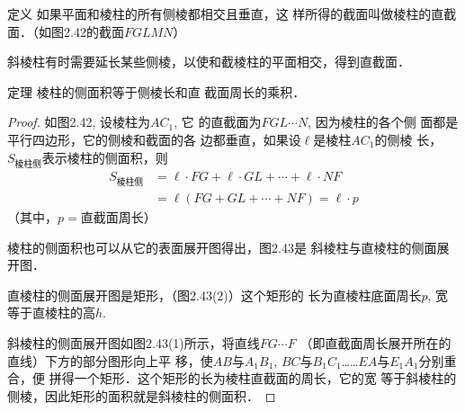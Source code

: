 \begin{blk}{定义}
    如果平面和棱柱的所有侧棱都相交且垂直，这
样所得的截面叫做棱柱的直截面．（如图2.42的截面$FGLM
N$）
\end{blk}

\begin{figure}[htp]
    \centering
{}
    \caption{}
\end{figure}


斜棱柱有时需要延长某些侧棱，以使和截棱柱的平面相交，得到直截面．

\begin{blk}{定理}
    棱柱的侧面积等于侧棱长和直
截面周长的乘积．
\end{blk}

\begin{proof}
如图2.42, 设棱柱为$AC_1$, 它
的直截面为$FGL\cdots N$, 因为棱柱的各个侧
面都是平行四边形，它的侧棱和截面的各
边都垂直，如果设$\ell$是棱柱$AC_1$的侧棱
长，$S_{\text{棱柱侧}}$表示棱柱的侧面积，则
\[\begin{split}
    S_{\text{棱柱侧}}&=\ell\cdot FG+\ell\cdot GL+\cdots+\ell\cdot NF\\
    &=\ell(FG+GL+\cdots+NF)=\ell\cdot p
\end{split}\]
（其中，$p=$直截面周长）

棱柱的侧面积也可以从它的表面展开图得出，图2.43是
斜棱柱与直棱柱的侧面展开图．

直棱柱的侧面展开图是矩形，（图2.43(2)）这个矩形的
长为直棱柱底面周长$p$, 宽等于直棱柱的高$h$. 

斜棱柱的侧面展开图如图2.43(1)所示，将直线$FG\cdots F$
（即直截面周长展开所在的直线）下方的部分图形向上平
移，使$AB$与$A_1B_1$, $BC$与$B_1C_1$……$EA$与$E_1A_1$分别重合，便
拼得一个矩形．这个矩形的长为棱柱直截面的周长，它的宽
等于斜棱柱的侧棱，因此矩形的面积就是斜棱柱的侧面积．
\end{proof}

